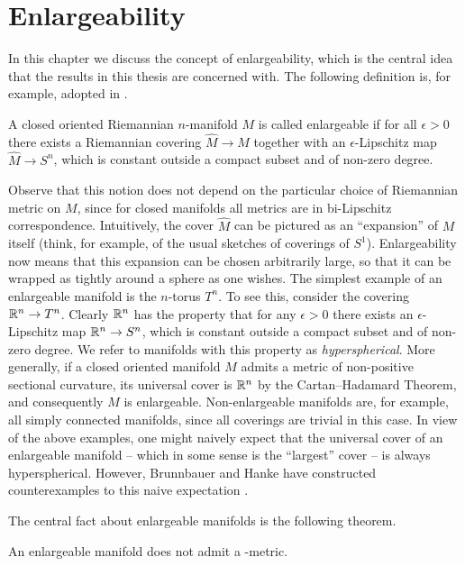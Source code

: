 \chapter{Enlargeability}
\label{chapter:enlargeability}

In this chapter we discuss the concept of enlargeability, which is the central idea that the results in this thesis are concerned with. The following definition is, for example, adopted in \cite{LawsonMichelsohn1989SpinGeometry, BrunnbauerHanke}.
\begin{definition}
    \label{enl:def:enlargeability}
    A closed oriented Riemannian $n$-manifold $M$ is called enlargeable if for all $\epsilon >0$ there exists a Riemannian covering $\hat{M} \to M$ together with an $\epsilon$-Lipschitz map $\hat{M} \to S^n$, which is constant outside a compact subset and of non-zero degree.
\end{definition}

Observe that this notion does not depend on the particular choice of Riemannian metric on $M$, since for closed manifolds all metrics are in bi-Lipschitz correspondence. Intuitively, the cover $\hat{M}$ can be pictured as an ``expansion'' of $M$ itself (think, for example, of the usual sketches of coverings of $S^1$). Enlargeability now means that this expansion can be chosen arbitrarily large, so that it can be wrapped as tightly around a sphere as one wishes. 
The simplest example of an enlargeable manifold is the $n$-torus $T^n$. To see this, consider the covering $\mathbb{R}^n \to T^n$. Clearly $\mathbb{R}^n$ has the property that for any $\epsilon > 0$ there exists an $\epsilon$-Lipschitz map $\mathbb{R}^n \to S^n$, which is constant outside a compact subset and of non-zero degree. We refer to manifolds with this property as \emph{hyperspherical}. More generally, if a closed oriented manifold $M$ admits a metric of non-positive sectional curvature, its universal cover is $\mathbb{R}^n$ by the Cartan--Hadamard Theorem, and consequently $M$ is enlargeable. Non-enlargeable manifolds are, for example, all simply connected manifolds, since all coverings are trivial in this case.
In view of the above examples, one might naively expect that the universal cover of an enlargeable manifold -- which in some sense is the ``largest'' cover -- is always hyperspherical. However, Brunnbauer and Hanke have constructed counterexamples to this naive expectation \cite[Thm. 1.4]{BrunnbauerHanke}.

The central fact about enlargeable manifolds is the following theorem.

\begin{theorem}
    \label{enl:thm:enl_mnf_do_not_admit_psc}
    An enlargeable manifold does not admit a \psc-metric.
\end{theorem}

